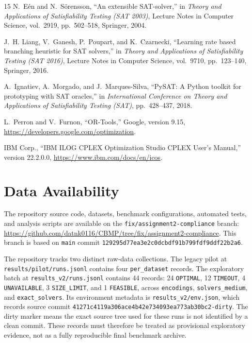 \documentclass[a4paper,fleqn]{cas-sc}
\begin{document}
\begin{thebibliography}{15}
N.~E\'en and N.~S\"orensson, ``An extensible SAT-solver,'' in \emph{Theory and Applications of Satisfiability Testing (SAT 2003)}, Lecture Notes in Computer Science, vol.~2919, pp.~502--518, Springer, 2004.

J.~H. Liang, V.~Ganesh, P.~Poupart, and K.~Czarnecki, ``Learning rate based branching heuristic for SAT solvers,'' in \emph{Theory and Applications of Satisfiability Testing (SAT 2016)}, Lecture Notes in Computer Science, vol.~9710, pp.~123--140, Springer, 2016.

A.~Ignatiev, A.~Morgado, and J.~Marques-Silva, ``PySAT: A Python toolkit for prototyping with SAT oracles,'' in \emph{International Conference on Theory and Applications of Satisfiability Testing (SAT)}, pp.~428--437, 2018.

L.~Perron and V.~Furnon, ``OR-Tools,'' Google, version 9.15, \url{https://developers.google.com/optimization}.

IBM Corp., ``IBM ILOG CPLEX Optimization Studio CPLEX User's Manual,'' version 22.2.0.0, \url{https://www.ibm.com/docs/en/icos}.
\end{thebibliography}

\section*{Data Availability}
The repository source code, datasets, benchmark configurations, automated tests, and
analysis scripts are available on the
\texttt{fix/assignment2-compliance} branch:
\url{https://github.com/datnk0116/CBMP/tree/fix/assignment2-compliance}.
This branch is based on \texttt{main} commit
\texttt{129295d77ea3e2c0dcbdf91b799fdf9ddf22b2a6}.

The repository tracks two distinct raw-data collections. The legacy pilot at
\texttt{results/pilot/runs.jsonl} contains four \texttt{per\_dataset} records.
The exploratory batch at \texttt{results\_v2/runs.jsonl} contains 44 records:
24 \texttt{OPTIMAL}, 12 \texttt{TIMEOUT}, 4 \texttt{UNAVAILABLE},
3 \texttt{SIZE\_LIMIT}, and 1 \texttt{FEASIBLE}, across
\texttt{encodings}, \texttt{solvers\_medium}, and \texttt{exact\_solvers}.
Its environment metadata is \texttt{results\_v2/env.json}, which records
source commit \texttt{41271c4119a306ace4b42e734093ea773ab30bc2-dirty}.
The dirty marker means the exact source tree used for these runs is not identified
by a clean commit. These records must therefore be treated as provisional exploratory
evidence, not as a fully reproducible final benchmark archive.
\end{document}
